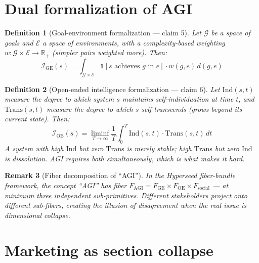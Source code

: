 \documentclass[11pt,a4paper]{article}
\newtheorem{definition}{Definition}[section]
\newtheorem{remark}[definition]{Remark}
\begin{document}
\section{Dual formalization of AGI}
\label{sec:dual}

\begin{definition}[Goal-environment formalization --- claim 5]
\label{def:goal-env}
Let $\mathcal{G}$ be a space of goals and $\mathcal{E}$ a space of
environments, with a complexity-based weighting $w : \mathcal{G} \times \mathcal{E} \to \mathbb{R}_+$
(simpler pairs weighted more). Then:
\[
  \mathcal{I}_{\text{GE}}(s) = \int_{\mathcal{G} \times \mathcal{E}}
    \mathbb{1}[s \text{ achieves } g \text{ in } e] \cdot w(g, e)\, d(g, e)
\]
\end{definition}

\begin{definition}[Open-ended intelligence formalization --- claim 6]
\label{def:open-ended}
Let $\mathrm{Ind}(s, t)$ measure the degree to which system $s$ maintains
self-individuation at time $t$, and $\mathrm{Trans}(s, t)$ measure the degree
to which $s$ self-transcends (grows beyond its current state). Then:
\[
  \mathcal{I}_{\text{OE}}(s) = \liminf_{T \to \infty}
    \frac{1}{T} \int_0^T \mathrm{Ind}(s, t) \cdot \mathrm{Trans}(s, t)\, dt
\]
A system with high $\mathrm{Ind}$ but zero $\mathrm{Trans}$ is merely stable;
high $\mathrm{Trans}$ but zero $\mathrm{Ind}$ is dissolution. AGI requires
both simultaneously, which is what makes it hard.
\end{definition}

\begin{remark}[Fiber decomposition of ``AGI'']
In the Hyperseed fiber-bundle framework, the concept ``AGI'' has fiber
$F_{\text{AGI}} = F_{\text{GE}} \times F_{\text{OE}} \times F_{\text{social}}$
--- at minimum three independent sub-primitives. Different stakeholders project
onto different sub-fibers, creating the illusion of disagreement when the
real issue is dimensional collapse.
\end{remark}

\section{Marketing as section collapse}
\label{sec:marketing}
\end{document}

